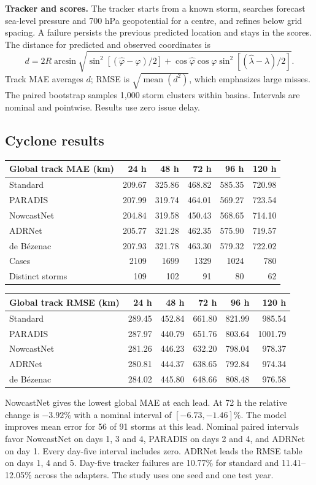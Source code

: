 \documentclass[10pt,a4paper]{article}
\begin{document}
\textbf{Tracker and scores.} The tracker starts from a known storm, searches forecast sea-level pressure and 700 hPa geopotential for a centre, and refines below grid spacing. A failure persists the previous predicted location and stays in the scores. The distance for predicted and observed coordinates is
\[
 d=2R\arcsin\sqrt{\sin^2[(\widehat\varphi-\varphi)/2]
 +\cos\widehat\varphi\cos\varphi\sin^2[(\widehat\lambda-\lambda)/2]} .
\]
Track MAE averages \(d\); RMSE is \(\sqrt{\operatorname{mean}(d^2)}\), which emphasizes large misses. The paired bootstrap samples 1,000 storm clusters within basins. Intervals are nominal and pointwise. Results use zero issue delay.

\newpage
\subsection{Cyclone results}
\begin{center}
\begin{tabular}{@{}lrrrrr@{}}
\toprule Global track MAE (km) & 24 h & 48 h & 72 h & 96 h & 120 h\\\midrule
Standard & 209.67 & 325.86 & 468.82 & 585.35 & 720.98\\
PARADIS & 207.99 & 319.74 & 464.01 & 569.27 & 723.54\\
NowcastNet & 204.84 & 319.58 & 450.43 & 568.65 & 714.10\\
ADRNet & 205.77 & 321.28 & 462.35 & 575.90 & 719.57\\
de B\'ezenac & 207.93 & 321.78 & 463.30 & 579.32 & 722.02\\
\midrule Cases & 2109 & 1699 & 1329 & 1024 & 780\\
Distinct storms & 109 & 102 & 91 & 80 & 62\\\bottomrule
\end{tabular}

\smallskip
\begin{tabular}{@{}lrrrrr@{}}
\toprule Global track RMSE (km) & 24 h & 48 h & 72 h & 96 h & 120 h\\\midrule
Standard & 289.45 & 452.84 & 661.80 & 821.99 & 985.54\\
PARADIS & 287.97 & 440.79 & 651.76 & 803.64 & 1001.79\\
NowcastNet & 281.26 & 446.23 & 632.20 & 798.04 & 978.37\\
ADRNet & 280.81 & 444.37 & 638.65 & 792.84 & 974.34\\
de B\'ezenac & 284.02 & 445.80 & 648.66 & 808.48 & 976.58\\\bottomrule
\end{tabular}
\end{center}
NowcastNet gives the lowest global MAE at each lead. At 72 h the relative change is \(-3.92\%\) with a nominal interval of \([-6.73,-1.46]\%\). The model improves mean error for 56 of 91 storms at this lead. Nominal paired intervals favor NowcastNet on days 1, 3 and 4, PARADIS on days 2 and 4, and ADRNet on day 1. Every day-five interval includes zero. ADRNet leads the RMSE table on days 1, 4 and 5. Day-five tracker failures are 10.77\% for standard and 11.41--12.05\% across the adapters. The study uses one seed and one test year.
\end{document}
